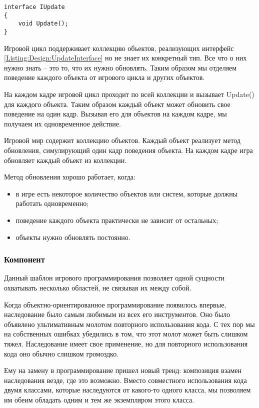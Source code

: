 \begin{lstlisting}[caption={Интерфейс для метода обновления}, label=Listing:Design:UpdateInterface]
interface IUpdate
{
    void Update();
}
\end{lstlisting}

Игровой цикл поддерживает коллекцию объектов, реализующих интерфейс \ref{Listing:Design:UpdateInterface} но не знает их конкретный тип. Все что о них нужно знать -- это то, что их нужно обновлять. Таким образом мы отделяем поведение каждого объекта от игрового цикла и других объектов.

На каждом кадре игровой цикл проходит по всей коллекции и вызывает Update() для каждого объекта. Таким образом каждый объект может обновить свое поведение на один кадр. Вызывая его для объектов на каждом кадре, мы получаем их одновременное действие.

Игровой мир содержит коллекцию объектов. Каждый объект реализует метод обновления, симулирующий один кадр поведения объекта. На каждом кадре игра обновляет каждый объект из коллекции.

Метод обновления хорошо работает, когда:
\begin{itemize}
    \item в игре есть некоторое количество объектов или систем, которые должны работать одновременно;
    \item поведение каждого объекта практически не зависит от остальных;
    \item объекты нужно обновлять постоянно.
\end{itemize}


\subsubsection{Компонент}

Данный шаблон игрового программирования позволяет одной сущности охватывать несколько областей, не связывая их между собой.

Когда объектно-ориентированное программирование появилось впервые, наследование было самым любимым из всех его инструментов. Оно было объявлено ультимативным молотом повторного использования кода. С тех пор мы на собственных ошибках убедились в том, что этот молот может быть слишком тяжел. Наследование имеет свое применение, но для повторного использования кода оно обычно слишком громоздко.

Ему на замену в программирование пришел новый тренд: композиция взамен наследования везде, где это возможно. Вместо совместного использования кода двумя классами, которые наследуются от какого-то одного класса, мы позволяем им обеим обладать одним и тем же экземпляром этого класса.

